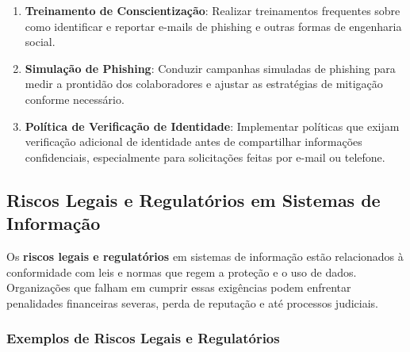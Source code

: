 \documentclass[12pt,oneside,a4paper,article]{abntex2}
\begin{document}
\begin{enumerate}
    \item \textbf{Treinamento de Conscientização}: Realizar treinamentos frequentes sobre como identificar e reportar e-mails de phishing e outras formas de engenharia social.

    \item \textbf{Simulação de Phishing}: Conduzir campanhas simuladas de phishing para medir a prontidão dos colaboradores e ajustar as estratégias de mitigação conforme necessário.

    \item \textbf{Política de Verificação de Identidade}: Implementar políticas que exijam verificação adicional de identidade antes de compartilhar informações confidenciais, especialmente para solicitações feitas por e-mail ou telefone.
\end{enumerate}

\newpage

\subsection {\textbf{Riscos Legais e Regulatórios em Sistemas de Informação}}

Os \textbf{riscos legais e regulatórios} em sistemas de informação estão relacionados à conformidade com leis e normas que regem a proteção e o uso de dados. Organizações que falham em cumprir essas exigências podem enfrentar penalidades financeiras severas, perda de reputação e até processos judiciais.

\subsubsection{\textbf{Exemplos de Riscos Legais e Regulatórios}}
\end{document}
